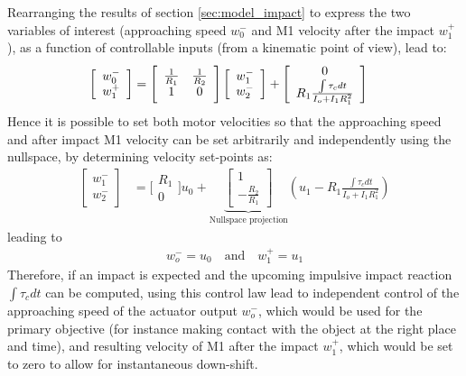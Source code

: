 Rearranging the results of section \ref{sec:model_impact} to express the two variables of interest (approaching speed $w_0^-$ and M1 velocity after the impact $w_1^+$), as a function of controllable inputs (from a kinematic point of view), lead to:
%
\begin{align}
\left[ \begin{array}{c} w_0^- \\ w_1^+ \end{array} \right] &= \Bigg[ \begin{array}{c c} \frac{1}{R_1} & \frac{1}{R_2}\\ 1 & 0 \end{array} \Bigg] \left[ \begin{array}{c} w_1^- \\ w_2^- \end{array} \right] + \left[ \begin{array}{c} 0 \\ R_1 \frac{\int{\tau_c dt}}{I_o + I_1 R_1^2} \end{array} \right]
\label{eq:dsdm_impact_approx_sol}
\end{align}
%
Hence it is possible to set both motor velocities so that the approaching speed and after impact M1 velocity can be set arbitrarily and independently using the nullspace, by determining velocity set-points as:
%
\begin{align}
\left[ \begin{array}{c} w_1^- \\ w_2^- \end{array} \right] &= \Bigg[ \begin{array}{c} R_1 \\ 0  \end{array} \Bigg] u_0  + 
\underbrace{ \left[ \begin{array}{c} 1 \\ -\frac{R_2}{R_1} \end{array} \right]}_{\text{Nullspace projection}}
 \left( u_1 - R_1 \frac{\int{\tau_c dt}}{I_o + I_1 R_1^2} \right) 
\end{align}
%
leading to
%
\begin{align}
 w_o^- = u_0 \quad \text{and} \quad w_1^+ = u_1
\end{align}
%
Therefore, if an impact is expected and the upcoming impulsive impact reaction $\int{\tau_c dt}$ can be computed, using this control law lead to independent control of the approaching speed of the actuator output $w_o^-$, which would be used for the primary objective (for instance making contact with the object at the right place and time), and resulting velocity of M1 after the impact $w_1^+$, which would be set to zero to allow for instantaneous down-shift.

